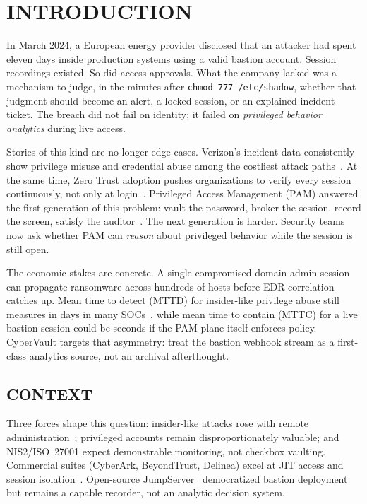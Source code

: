 \section{INTRODUCTION}
\label{art-sec:intro}

In March 2024, a European energy provider disclosed that an attacker had spent eleven days inside production systems using a valid bastion account. Session recordings existed. So did access approvals. What the company lacked was a mechanism to judge, in the minutes after \texttt{chmod 777 /etc/shadow}, whether that judgment should become an alert, a locked session, or an explained incident ticket. The breach did not fail on identity; it failed on \textit{privileged behavior analytics} during live access.

Stories of this kind are no longer edge cases. Verizon's incident data consistently show privilege misuse and credential abuse among the costliest attack paths~\cite{ref21}. At the same time, Zero Trust adoption pushes organizations to verify every session continuously, not only at login~\cite{ref4,ref22}. Privileged Access Management (PAM) answered the first generation of this problem: vault the password, broker the session, record the screen, satisfy the auditor~\cite{ref1,ref5}. The next generation is harder. Security teams now ask whether PAM can \textit{reason} about privileged behavior while the session is still open.

The economic stakes are concrete. A single compromised domain-admin session can propagate ransomware across hundreds of hosts before EDR correlation catches up. Mean time to detect (MTTD) for insider-like privilege abuse still measures in days in many SOCs~\cite{ref6,ref24}, while mean time to contain (MTTC) for a live bastion session could be seconds if the PAM plane itself enforces policy. CyberVault targets that asymmetry: treat the bastion webhook stream as a first-class analytics source, not an archival afterthought.

\subsection{CONTEXT}
Three forces shape this question: insider-like attacks rose with remote administration~\cite{ref6}; privileged accounts remain disproportionately valuable; and NIS2/ISO~27001 expect demonstrable monitoring, not checkbox vaulting. Commercial suites (CyberArk, BeyondTrust, Delinea) excel at JIT access and session isolation~\cite{ref16,ref17,ref18}. Open-source JumpServer~\cite{ref5} democratized bastion deployment but remains a capable recorder, not an analytic decision system.


